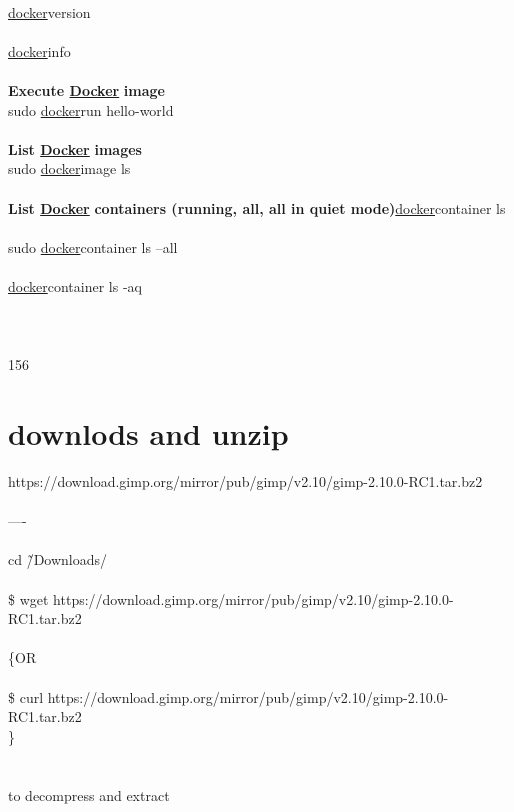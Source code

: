\documentclass[10pt,a4paper]{article}
\begin{document}
{{{{{{{{{{{{{{\\
	\hyperlink{docker}{docker}}{\large  version\\
\\
	\hyperlink{docker}{docker}}{\large  info\\
\\
\textbf{Execute \hyperlink{docker}{Docker}}}{\large \textbf{ image}}{\large \\
	sudo \hyperlink{docker}{docker}}{\large  run hello-world\\
\\
\textbf{List \hyperlink{docker}{Docker}}}{\large \textbf{ images}}{\large \\
	sudo \hyperlink{docker}{docker}}{\large  image ls\\
\\
\textbf{List \hyperlink{docker}{Docker}}}{\large \textbf{ containers (running, all, all in quiet mode)}}{\large \hyperlink{docker}{docker}}{\large  container ls\\
\\
	sudo \hyperlink{docker}{docker}}{\large  container ls --all\\
\\
	\hyperlink{docker}{docker}}{\large  container ls -aq\\
\\
\\
\\
}156
\hypertarget{downlods_and_unzip}{\section {downlods and unzip}}
https://download.gimp.org/mirror/pub/gimp/v2.10/gimp-2.10.0-RC1.tar.bz2\\
\\
----\\
\\
cd \~/Downloads/ \\
\\
\$ wget https://download.gimp.org/mirror/pub/gimp/v2.10/gimp-2.10.0-RC1.tar.bz2\\
\\
\{OR\\
\\
\$ curl https://download.gimp.org/mirror/pub/gimp/v2.10/gimp-2.10.0-RC1.tar.bz2\\
\}\\
\\
\\
to decompress and extract\\
\\
}}}}}}}}}}}}}
\end{document}
